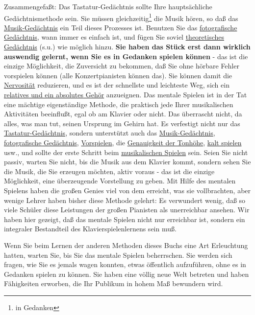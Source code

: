 Zusammengefaßt: Das Tastatur-Gedächtnis sollte Ihre hauptsächliche Gedächtnismethode sein.
Sie müssen gleichzeitig\footnote{in Gedanken} die Musik hören, so daß das \hyperref[c1iii6musik]{Musik-Gedächtnis} ein Teil dieses Prozesses ist.
Benutzen Sie das \hyperref[c1iii6foto]{fotografische Gedächtnis}, wann immer es einfach ist, und fügen Sie soviel \hyperref[c1iii6theorie]{theoretisches Gedächtnis} (s.u.) wie möglich hinzu.
\textbf{Sie haben das Stück erst dann wirklich auswendig gelernt, wenn Sie es in Gedanken spielen können} - das ist die einzige Möglichkeit, die Zuversicht zu bekommen, daß Sie ohne hörbare Fehler vorspielen können (alle Konzertpianisten können das).
Sie können damit die \hyperref[c1iii15]{Nervosität} reduzieren, und es ist der schnellste und leichteste Weg, sich ein \hyperref[c1iii12]{relatives und ein absolutes Gehör} anzueignen.
Das mentale Spielen ist in der Tat eine mächtige eigenständige Methode, die praktisch jede Ihrer musikalischen Aktivitäten beeinflußt, egal ob am Klavier oder nicht.
Das überrascht nicht, da alles, was man tut, seinen Ursprung im Gehirn hat.
Es verfestigt nicht nur das \hyperref[c1iii6tastatur]{Tastatur-Gedächtnis}, sondern unterstützt auch das \hyperref[c1iii6musik]{Musik-Gedächtnis}, \hyperref[c1iii6foto]{fotografische Gedächtnis}, \hyperref[c1iii14]{Vorspielen}, die \hyperref[c1iii12]{Genauigkeit der Tonhöhe}, \hyperref[c1iii6g]{kalt spielen} usw., und sollte der erste Schritt beim \hyperref[c1iii14d]{musikalischen Spielen} sein.
Seien Sie nicht passiv, warten Sie nicht, bis die Musik aus dem Klavier kommt, sondern sehen Sie die Musik, die Sie erzeugen möchten, aktiv voraus - das ist die einzige Möglichkeit, eine überzeugende Vorstellung zu geben.
Mit Hilfe des mentalen Spielens haben die großen Genies viel von dem erreicht, was sie vollbrachten, aber wenige Lehrer haben bisher diese Methode gelehrt: Es verwundert wenig, daß so viele Schüler diese Leistungen der großen Pianisten als unerreichbar ansehen.
Wir haben hier gezeigt, daß das mentale Spielen nicht nur erreichbar ist, sondern ein integraler Bestandteil des Klavierspielenlernens sein muß.

Wenn Sie beim Lernen der anderen Methoden dieses Buchs eine Art Erleuchtung hatten, warten Sie, bis Sie das mentale Spielen beherrschen.
Sie werden sich fragen, wie Sie es jemals wagen konnten, etwas öffentlich aufzuführen, ohne es in Gedanken spielen zu können.
Sie haben eine völlig neue Welt betreten und haben Fähigkeiten erworben, die Ihr Publikum in hohem Maß bewundern wird.


\label{c1iii6theorie}

